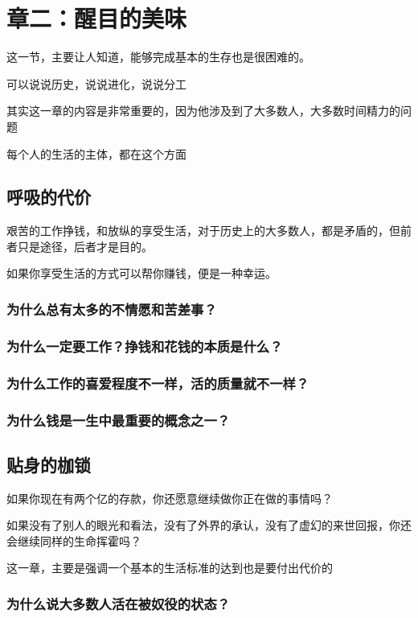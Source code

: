 \chapter{章二：醒目的美味}

这一节，主要让人知道，能够完成基本的生存也是很困难的。

可以说说历史，说说进化，说说分工

其实这一章的内容是非常重要的，因为他涉及到了大多数人，大多数时间精力的问题

每个人的生活的主体，都在这个方面

\section{呼吸的代价}

艰苦的工作挣钱，和放纵的享受生活，对于历史上的大多数人，都是矛盾的，但前者只是途径，后者才是目的。

如果你享受生活的方式可以帮你赚钱，便是一种幸运。

\subsection{为什么总有太多的不情愿和苦差事？}
\subsection{为什么一定要工作？挣钱和花钱的本质是什么？}
\subsection{为什么工作的喜爱程度不一样，活的质量就不一样？}
\subsection{为什么钱是一生中最重要的概念之一？}

\section{贴身的枷锁}

如果你现在有两个亿的存款，你还愿意继续做你正在做的事情吗？

如果没有了别人的眼光和看法，没有了外界的承认，没有了虚幻的来世回报，你还会继续同样的生命挥霍吗？

这一章，主要是强调一个基本的生活标准的达到也是要付出代价的

\subsection{为什么说大多数人活在被奴役的状态？}
